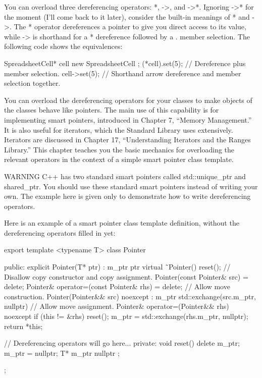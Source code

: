 
You can overload three dereferencing operators: *, ->, and ->*. Ignoring ->* for the moment (I’ll come back to it later), consider the built-in meanings of * and ->. The * operator dereferences a pointer to give you direct access to its value, while -> is shorthand for a * dereference followed by a . member selection. The following code shows the equivalences:

\begin{cpp}
SpreadsheetCell* cell { new SpreadsheetCell };
(*cell).set(5); // Dereference plus member selection.
cell->set(5); // Shorthand arrow dereference and member selection together.
\end{cpp}

You can overload the dereferencing operators for your classes to make objects of the classes behave like pointers. The main use of this capability is for implementing smart pointers, introduced in Chapter 7, “Memory Management.” It is also useful for iterators, which the Standard Library uses extensively. Iterators are discussed in Chapter 17, “Understanding Iterators and the Ranges Library.” This chapter teaches you the basic mechanics for overloading the relevant operators in the context of a simple smart pointer class template.

\begin{myWarning}{WARNING}
C++ has two standard smart pointers called std::unique\_ptr and shared\_ptr. You should use these standard smart pointers instead of writing your own. The example here is given only to demonstrate how to write dereferencing operators.
\end{myWarning}

Here is an example of a smart pointer class template definition, without the dereferencing operators filled in yet:

\begin{cpp}
export template <typename T> class Pointer
{
    public:
        explicit Pointer(T* ptr) : m_ptr { ptr } {}
        virtual ˜Pointer() { reset(); }
        // Disallow copy constructor and copy assignment.
        Pointer(const Pointer& src) = delete;
        Pointer& operator=(const Pointer& rhs) = delete;
        // Allow move construction.
        Pointer(Pointer&& src) noexcept : m_ptr{ std::exchange(src.m_ptr, nullptr)}
        { }
        // Allow move assignment.
        Pointer& operator=(Pointer&& rhs) noexcept
        {
            if (this != &rhs) {
                reset();
                m_ptr = std::exchange(rhs.m_ptr, nullptr);
            }
            return *this;
        }

        // Dereferencing operators will go here...
    private:
        void reset()
        {
            delete m_ptr;
            m_ptr = nullptr;
        }
        T* m_ptr { nullptr };
};
\end{cpp}

